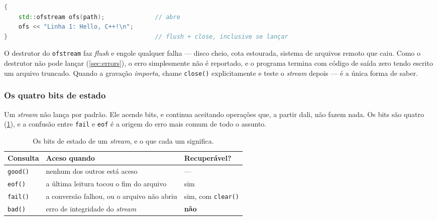 \begin{lstlisting}[style=bt, language=C++,
    caption={O bloco \emph{é} o \texttt{close} (\texttt{demo\_fstream.hpp},
             seção 1).}]
{
    std::ofstream ofs(path);              // abre
    ofs << "Linha 1: Hello, C++!\n";
}                                         // flush + close, inclusive se lançar
\end{lstlisting}

\begin{armadilha}
O destrutor do \texttt{ofstream} faz \emph{flush} e engole qualquer falha ---
disco cheio, cota estourada, sistema de arquivos remoto que caiu. Como o
destrutor não pode lançar (\cref{sec:errors}), o erro simplesmente não é
reportado, e o programa termina com código de saída zero tendo escrito um
arquivo truncado. Quando a gravação \emph{importa}, chame \texttt{close()}
explicitamente e teste o \emph{stream} depois --- é a única forma de saber.
\end{armadilha}

\subsubsection{Os quatro bits de estado}

Um \emph{stream} não lança por padrão. Ele acende bits, e continua aceitando
operações que, a partir dali, não fazem nada. Os bits são quatro
(\cref{tab:stream-bits}), e a confusão entre \texttt{fail} e \texttt{eof} é a
origem do erro mais comum de todo o assunto.

\begin{table}[htbp]
\centering
\caption{Os bits de estado de um \emph{stream}, e o que cada um significa.}
\label{tab:stream-bits}
\footnotesize
\begin{tabular}{@{}lll@{}}
\toprule
\textbf{Consulta} & \textbf{Aceso quando} & \textbf{Recuperável?} \\
\midrule
\texttt{good()} & nenhum dos outros está aceso & --- \\
\texttt{eof()}  & a última leitura tocou o fim do arquivo & sim \\
\texttt{fail()} & a conversão falhou, ou o arquivo não abriu & sim, com \texttt{clear()} \\
\texttt{bad()}  & erro de integridade do \emph{stream} & \textbf{não} \\
\bottomrule
\end{tabular}
\end{table}

